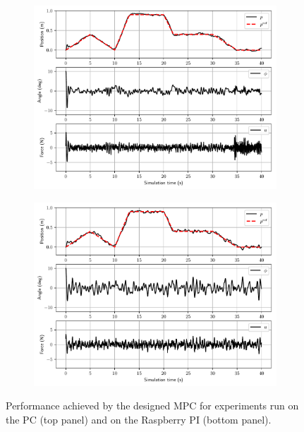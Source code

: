 \documentclass{article}
\begin{document}
\begin{figure}
\centering
\begin{subfigure}[b]{\textwidth}
   \includegraphics[width=1\linewidth]{fig/BEST_GLIS_PC.pdf}
\end{subfigure}

\begin{subfigure}[b]{\textwidth}
   \includegraphics[width=1\linewidth]{fig/BEST_GLIS_PI.pdf}
\end{subfigure}
\caption{Performance achieved by the designed MPC  for experiments run on the PC (top panel) and on the Raspberry PI (bottom panel).}
\label{fig:timetraces}
\end{figure}
\end{document}
